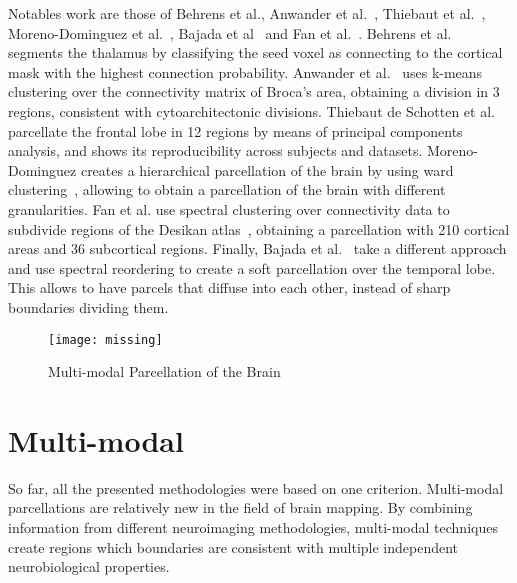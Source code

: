 Notables work are those of Behrens et al.\cite{Behrens2003}, Anwander et al.~\cite{Anwander2006},
Thiebaut et al.~\cite{ThiebautdeSchotten2016}, Moreno-Dominguez et al.~\cite{Moreno-Dominguez2014},
Bajada et al~\cite{Bajada2017} and Fan et al.~\cite{Fan2016}.
Behrens et al.~\cite{Behrens2003} segments the thalamus by classifying the seed voxel as connecting to the cortical
mask with the highest connection probability. Anwander et al.~\cite{Anwander2006}
uses k-means clustering over the connectivity matrix of Broca's area, obtaining
a division in 3 regions, consistent with cytoarchitectonic divisions.
Thiebaut de Schotten et al.~\cite{ThiebautdeSchotten2016}
parcellate the frontal lobe in 12 regions by means of principal components analysis,
and shows its reproducibility across subjects and datasets.
Moreno-Dominguez creates a hierarchical parcellation of the brain by using
ward clustering~\cite{Moreno-Dominguez2014}, allowing to obtain a parcellation
of the brain with different granularities. Fan et al.\cite{Fan2016} use
spectral clustering over connectivity data to subdivide regions of the Desikan
atlas~\cite{Desikan2006}, obtaining a parcellation with 210 cortical areas and
36 subcortical regions. Finally, Bajada et al.~\cite{Bajada2017} take a different
approach and use spectral reordering to create a soft parcellation over the
temporal lobe. This allows to have parcels that diffuse into each other, instead
of sharp boundaries dividing them.

\begin{figure*}[t]
    \texttt{[image: missing]}
    \caption{Multi-modal Parcellation of the Brain}
    \label{fig:brain_function}
\end{figure*}

\section{Multi-modal}
\label{sec:multimodal}
So far, all the presented methodologies were based on one criterion.
Multi-modal parcellations are relatively new in the field of brain mapping.
By combining information from different neuroimaging methodologies, multi-modal
techniques create regions which boundaries are consistent with multiple
independent neurobiological properties.

